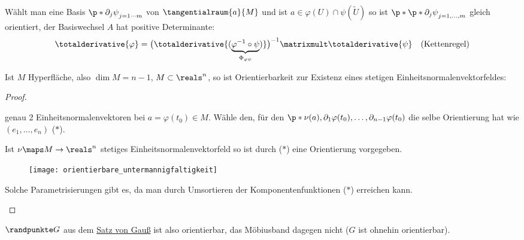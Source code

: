 Wählt man eine Basis \( \p*{ \partial_j\psi }_{j=1\cdots m} \) von \( \tangentialraum{a}{M} \) und ist \( a\in\varphi(U)\cap\psi(\tilde{U}) \) so ist \( \p*{\p*{ \partial_j\psi }_{j=1,\dotsc, m}  } \) gleich orientiert, \dh der Basiswechsel \( A \) hat positive Determinante:
\begin{equation*}
  \totalderivative{\varphi}=\big(\totalderivative{(\underbrace{\varphi^{-1}\circ\psi}_{\Phi_{\varphi\psi}})}\big)^{-1}\matrixmult\totalderivative{\psi}\quad \text{(Kettenregel)}
\end{equation*}

\begin{bemerkung}
    Ist \( M \) Hyperfläche, also \( \dim M=n-1 \), \( M\subset\reals^n \), so ist Orientierbarkeit zur Existenz eines stetigen Einheitsnormalenvektorfeldes:
\end{bemerkung}
\begin{proof}
  \begin{proofdescription}
    \item[\hin] \texists genau 2 Einheitsnormalenvektoren bei \( a=\varphi(t_0)\in M \).
    Wähle den, für den \( \p*{ \nu(a),\partial_1\varphi(t_0),\dotsc ,\partial_{n-1}\varphi(t_0) } \) die selbe Orientierung hat wie \( (e_1,\dotsc ,e_n) \) (\( * \)).
    \item[\rueck] Ist \( \nu\maps M\to \reals^n \) stetiges Einheitsnormalenvektorfeld so ist durch (\( * \)) eine Orientierung vorgegeben.
    \begin{figure}[H]
      \centering
      \texttt{[image: orientierbare\_untermannigfaltigkeit]}
      \label{fig:orientierbare_untermannigfaltigkeit}
    \end{figure}
    Solche Parametrisierungen gibt es, da man durch Umsortieren der Komponentenfunktionen (\( * \)) erreichen kann.
  \end{proofdescription}
  
\end{proof}
      

\begin{beispiel*}
  \( \randpunkte G \) aus dem \hyperref[integralsatz_gauss]{Satz von Gauß} ist also orientierbar, das Möbiusband dagegen nicht (\( G \) ist ohnehin orientierbar).
\end{beispiel*}

